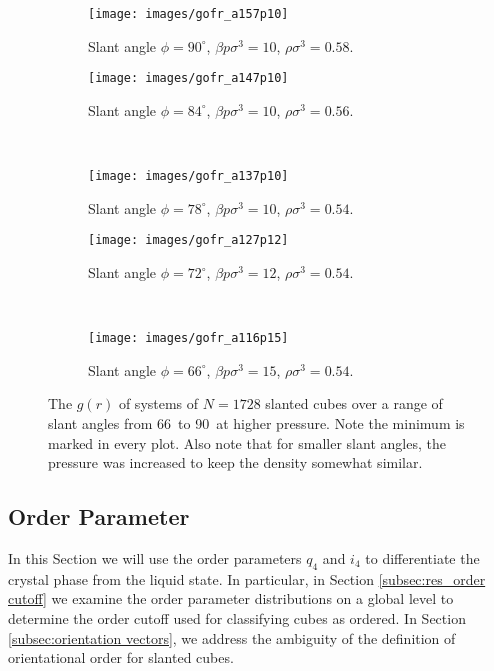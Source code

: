\documentclass[thesis]{subfiles}
\begin{document}
\begin{figure}[H]
	\centering
	\begin{subfigure}{0.49\textwidth}
	\texttt{[image: images/gofr\_a157p10]}
	\caption{Slant angle $\phi = 90^\circ$, $\beta p \sigma^3 = 10$, $\rho \sigma^3 = 0.58$. }
	\end{subfigure}
	\begin{subfigure}{0.49\textwidth}
		\texttt{[image: images/gofr\_a147p10]}
		\caption{Slant angle $\phi = 84^\circ$, $\beta p \sigma^3 = 10$, $\rho \sigma^3 = 0.56$. }
	\end{subfigure}
\\\vspace{10pt}
	\begin{subfigure}{0.49\textwidth}
		\texttt{[image: images/gofr\_a137p10]}
		\caption{Slant angle $\phi = 78^\circ$, $\beta p \sigma^3 = 10$, $\rho \sigma^3 = 0.54$. }
	\end{subfigure}
	\begin{subfigure}{0.49\textwidth}
		\texttt{[image: images/gofr\_a127p12]}
		\caption{Slant angle $\phi = 72^\circ$, $\beta p \sigma^3 = 12$, $\rho \sigma^3 = 0.54$. }
	\end{subfigure}
\\\vspace{10pt}
	\begin{subfigure}{0.49\textwidth}
		\texttt{[image: images/gofr\_a116p15]}
		\caption{Slant angle $\phi = 66^\circ$, $\beta p \sigma^3 = 15$, $\rho \sigma^3 = 0.54$. }
	\end{subfigure}
	
	\caption{The $g(r)$ of systems of $N = 1728$ slanted cubes over a range of slant angles from 66\degr\ to 90\degr\ at higher pressure. Note the minimum is marked in every plot. Also note that for smaller slant angles, the pressure was increased to keep the density somewhat similar.}\label{fig:gofr_Xtal}
\end{figure}

\subsection{Order Parameter} \label{subsec:order}

In this Section we will use the order parameters $q_4$ and $i_4$ to differentiate the crystal phase from the liquid state. In particular, in Section \ref{subsec:res_order cutoff} we examine the order parameter distributions on a global level to determine the order cutoff used for classifying cubes as ordered. In Section \ref{subsec:orientation vectors}, we address the ambiguity of the definition of orientational order for slanted cubes.
\end{document}
